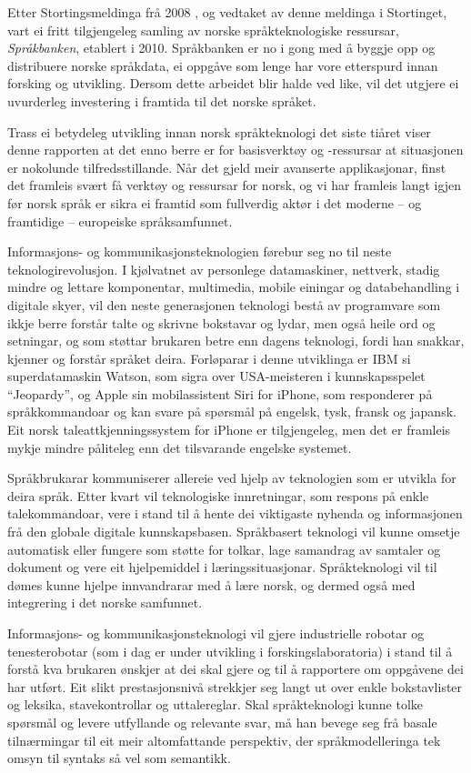 \begin{multicols}{2}
Etter Stortingsmeldinga frå 2008  \cite{stm35:2008}, og vedtaket av denne meldinga i Stortinget, vart ei fritt tilgjengeleg samling av norske språkteknologiske ressursar, \emph{Språkbanken}, etablert i 2010. Språkbanken er no i gong med å byggje opp og distribuere norske språkdata, ei oppgåve som lenge har vore etterspurd innan forsking og utvikling. Dersom dette arbeidet blir halde ved like, vil det utgjere ei uvurderleg investering i framtida til det norske språket.     

Trass ei betydeleg utvikling innan norsk språkteknologi det siste tiåret viser denne rapporten at det enno berre er for basisverktøy og -ressursar at situasjonen er nokolunde tilfredsstillande. Når det gjeld meir avanserte applikasjonar, finst det framleis svært få verktøy og ressursar for norsk, og vi har framleis langt igjen før norsk språk er sikra ei framtid som fullverdig aktør i det moderne -- og framtidige -- europeiske språksamfunnet.   

Informasjons- og kommunikasjonsteknologien førebur seg no til neste teknologirevolusjon. I kjølvatnet av personlege datamaskiner, nettverk, stadig mindre og lettare komponentar, multimedia, mobile einingar og databehandling i digitale skyer, vil den neste generasjonen teknologi bestå av programvare som ikkje berre forstår talte og skrivne bokstavar og lydar, men også heile ord og setningar, og som støttar brukaren betre enn dagens teknologi, fordi han snakkar, kjenner og forstår språket deira. Forløparar i denne utviklinga er IBM si superdatamaskin Watson, som sigra over USA-meisteren i kunnskapsspelet “Jeopardy”, og Apple sin mobilassistent Siri for iPhone, som responderer på språkkommandoar og kan svare på spørsmål på engelsk, tysk, fransk og japansk. Eit norsk taleattkjenningssystem for iPhone er tilgjengeleg, men det er framleis mykje mindre påliteleg enn det tilsvarande engelske systemet. 

Språkbrukarar kommuniserer allereie ved hjelp av teknologien som er utvikla for deira språk. Etter kvart vil teknologiske innretningar, som respons på enkle talekommandoar, vere i stand til å hente dei viktigaste nyhenda og informasjonen frå den globale digitale kunnskapsbasen. Språkbasert teknologi vil kunne omsetje automatisk eller fungere som støtte for tolkar, lage samandrag av samtaler og dokument og vere eit hjelpemiddel i læringssituasjonar. Språkteknologi vil til dømes kunne hjelpe innvandrarar med å lære norsk, og dermed også med integrering i det norske samfunnet.        
 
Informasjons- og kommunikasjonsteknologi vil gjere industrielle robotar og tenesterobotar (som i dag er under utvikling i forskingslaboratoria) i stand til å forstå kva brukaren ønskjer at dei skal gjere og til å rapportere om oppgåvene dei har utført. Eit slikt prestasjonsnivå strekkjer seg langt ut over enkle bokstavlister og leksika, stavekontrollar og uttalereglar. Skal språkteknologi kunne tolke spørsmål og levere utfyllande og relevante svar, må han bevege seg frå basale tilnærmingar til eit meir altomfattande perspektiv, der språkmodelleringa tek omsyn til syntaks så vel som semantikk.  


\end{multicols}
